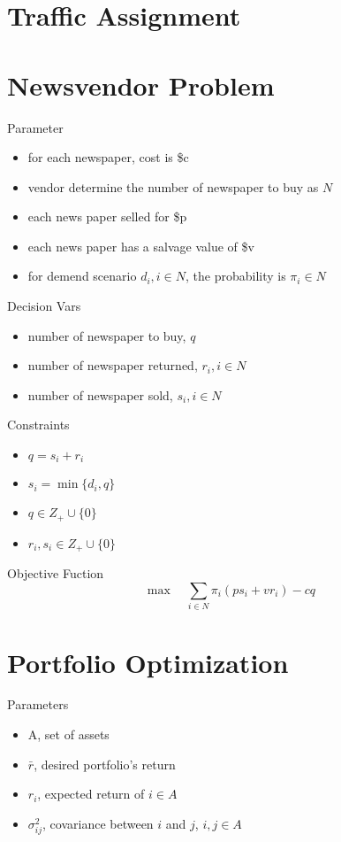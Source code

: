 		\section{Traffic Assignment}

		\section{Newsvendor Problem}
			Parameter
			\begin{itemize}
				\item for each newspaper, cost is \$c
				\item vendor determine the number of newspaper to buy as $N$
				\item each news paper selled for \$p
				\item each news paper has a salvage value of \$v
				\item for demend scenario $d_i, i\in N$, the probability is $\pi_i \in N$
			\end{itemize}

			Decision Vars
			\begin{itemize}
				\item number of newspaper to buy, $q$
				\item number of newspaper returned, $r_i, i \in N$
				\item number of newspaper sold, $s_i, i\in N$
			\end{itemize}

			Constraints
			\begin{itemize}
				\item $q = s_i + r_i$
				\item $s_i = \min \{d_i, q\}$
				\item $q \in Z_+ \cup \{0\}$
				\item $r_i, s_i \in Z_+ \cup \{0\}$
			\end{itemize}

			Objective Fuction
			\begin{equation}
				\max \quad \sum_{i \in N} \pi_i (ps_i + vr_i) - cq
			\end{equation}

		\section{Portfolio Optimization}
			Parameters
			\begin{itemize}
				\item A, set of assets
				\item $\bar{r}$, desired portfolio's return
				\item $r_i$, expected return of $i\in A$
				\item $\sigma_{ij}^2$, covariance between $i$ and $j$, $i, j \in A$
			\end{itemize}

